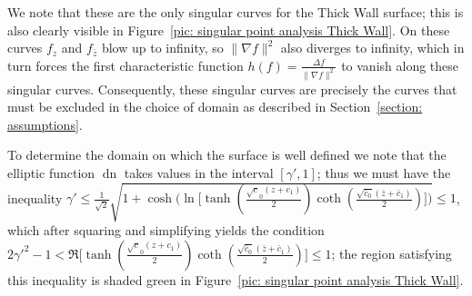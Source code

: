 \documentclass[12pt]{article}
\theoremstyle{plain}
\theoremstyle{definition}
\theoremstyle{remark}
\begin{document}
  We note that these are the only singular curves for the Thick Wall surface; this is also clearly visible in Figure~\ref{pic: singular point analysis Thick Wall}. On these curves \(f_z\) and \(f_{\bar z}\) blow up to infinity, so \(\|\nabla f\|^2\) also diverges to infinity, which in turn forces the first characteristic function \(h(f)=\tfrac{\Delta f}{\|\nabla f\|^2}\) to vanish along these singular curves. Consequently, these singular curves are precisely the curves that must be excluded in the choice of domain as described in Section~\ref{section: assumptions}.
  
  To determine the domain on which the surface is well defined we note that the elliptic function \(\operatorname{dn}\) takes values in the interval \([\gamma',1]\); thus we must have the inequality \(\gamma'\leq\tfrac{1}{\sqrt{2}}\sqrt{1 + \cosh\!\big(\ln\!\big[\tanh(\tfrac{\sqrt c_0(z+c_1)}{2})\coth(\tfrac{\sqrt{\bar c_0}(\bar z+\bar c_1)}{2})\big]\big)}\leq 1\), which after squaring and simplifying yields the condition \(2\gamma'^2-1<\Re\!\big[\tanh(\tfrac{\sqrt c_0(z+c_1)}{2})\coth(\tfrac{\sqrt{\bar c_0}(\bar z+\bar c_1)}{2})\big]\leq 1\); the region satisfying this inequality is shaded green in Figure~\ref{pic: singular point analysis Thick Wall}.
  
\end{document}
